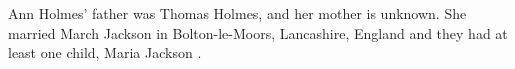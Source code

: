 
Ann Holmes' father was Thomas Holmes, and her mother is unknown.  She married March Jackson in Bolton-le-Moors, Lancashire, England and they had at least one child, Maria Jackson .

